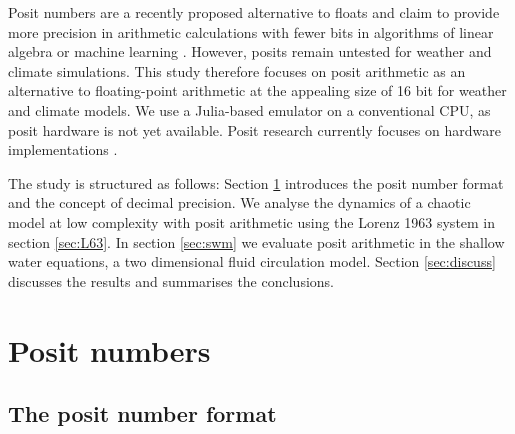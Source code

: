 \documentclass[draft]{agujournal2019}
\begin{document}
Posit numbers are a recently proposed alternative to floats and claim to provide more precision in arithmetic calculations with fewer bits in algorithms of linear algebra or machine learning \cite{Gustafson2017}. However, posits remain untested for weather and climate simulations. This study therefore focuses on posit arithmetic as an alternative to floating-point arithmetic at the appealing size of 16 bit for weather and climate models. We use a Julia-based emulator on a conventional CPU, as posit hardware is not yet available. Posit research currently focuses on hardware implementations \cite{VanDam2018,Chen2018,Chaurasiya2018,Glaser2017}.

The study  is structured as follows: Section \ref{sec:posits} introduces the posit number format and the concept of decimal precision. We analyse the dynamics of a chaotic model at low complexity with posit arithmetic using the Lorenz 1963 system in section \ref{sec:L63}. In section \ref{sec:swm} we evaluate posit arithmetic in the shallow water equations, a two dimensional fluid circulation model. Section \ref{sec:discuss} discusses the results and summarises the conclusions.

\section{Posit numbers}
\label{sec:posits}
\subsection{The posit number format}
\label{sec:posit_methods}
\end{document}
